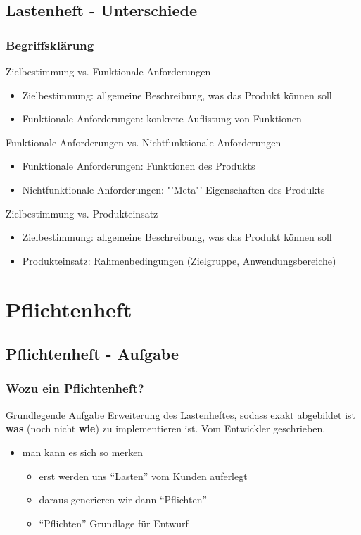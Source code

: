 \documentclass[18pt]{beamer}
\begin{document}
	\subsection{Lastenheft - Unterschiede}
	\begin{frame}
		\frametitle{Begriffsklärung}
		\begin{block}{Zielbestimmung vs. Funktionale Anforderungen}
			\pause
			\begin{itemize}
				\item Zielbestimmung: allgemeine Beschreibung, was das Produkt können soll
				\item Funktionale Anforderungen: konkrete Auflistung von Funktionen
			\end{itemize}
		\end{block}
		\pause
		\begin{block}{Funktionale Anforderungen vs. Nichtfunktionale Anforderungen}
			\pause
			\begin{itemize}
				\item Funktionale Anforderungen: Funktionen des Produkts
				\item Nichtfunktionale Anforderungen: "'Meta"'-Eigenschaften des Produkts
			\end{itemize}
		\end{block}
		\pause
		\begin{block}{Zielbestimmung vs. Produkteinsatz}
			\pause
			\begin{itemize}
				\item Zielbestimmung: allgemeine Beschreibung, was das Produkt können soll
				\item Produkteinsatz: Rahmenbedingungen (Zielgruppe, Anwendungsbereiche)
			\end{itemize}
		\end{block}
	\end{frame}
	
\section{Pflichtenheft}
	\subsection{Pflichtenheft - Aufgabe}
	\begin{frame}
		\frametitle{Wozu ein Pflichtenheft?}
		\begin{block}{Grundlegende Aufgabe}
			Erweiterung des Lastenheftes, sodass exakt abgebildet ist \textbf{was} (noch nicht \textbf{wie}) zu implementieren ist. Vom Entwickler geschrieben.
		\end{block}
	\pause
		\begin{itemize}
			\item man kann es sich so merken
			\begin{itemize}
				\item erst werden uns \enquote{Lasten} vom Kunden auferlegt
				\item daraus generieren wir dann \enquote{Pflichten}
				\item \enquote{Pflichten} Grundlage für Entwurf
			\end{itemize}
		\end{itemize}
	\end{frame}
	
\end{document}
